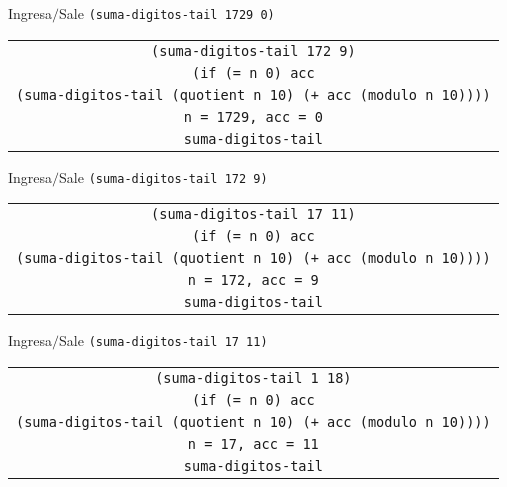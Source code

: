 \documentclass[letterpaper,11pt]{article}
\begin{document}
\begin{enumerate}
\begin{enumerate}
        Ingresa$/$Sale \texttt{(suma-digitos-tail 1729 0)}
        \begin{center}
            \begin{tabular}[h]{|c|}
                \hline
                \texttt{(suma-digitos-tail 172 9)} \\
                \texttt{(if (= n 0) acc} \\
                \texttt{(suma-digitos-tail (quotient n 10) 
                (+ acc (modulo n 10))))} \\
                \texttt{n = 1729, acc = 0} \\
                \texttt{suma-digitos-tail} \\
                \hline
            \end{tabular}
        \end{center}

        Ingresa$/$Sale \texttt{(suma-digitos-tail 172 9)}
        \begin{center}
            \begin{tabular}[h]{|c|}
                \hline
                \texttt{(suma-digitos-tail 17 11)} \\
                \texttt{(if (= n 0) acc} \\
                \texttt{(suma-digitos-tail (quotient n 10) 
                (+ acc (modulo n 10))))} \\
                \texttt{n = 172, acc = 9} \\
                \texttt{suma-digitos-tail} \\
                \hline
            \end{tabular}
        \end{center}

        Ingresa$/$Sale \texttt{(suma-digitos-tail 17 11)}
        \begin{center}
            \begin{tabular}[h]{|c|}
                \hline
                \texttt{(suma-digitos-tail 1 18)} \\
                \texttt{(if (= n 0) acc} \\
                \texttt{(suma-digitos-tail (quotient n 10) 
                (+ acc (modulo n 10))))} \\
                \texttt{n = 17, acc = 11} \\
                \texttt{suma-digitos-tail} \\
                \hline
            \end{tabular}
        \end{center}


\end{enumerate}
\end{enumerate}
\end{document}
